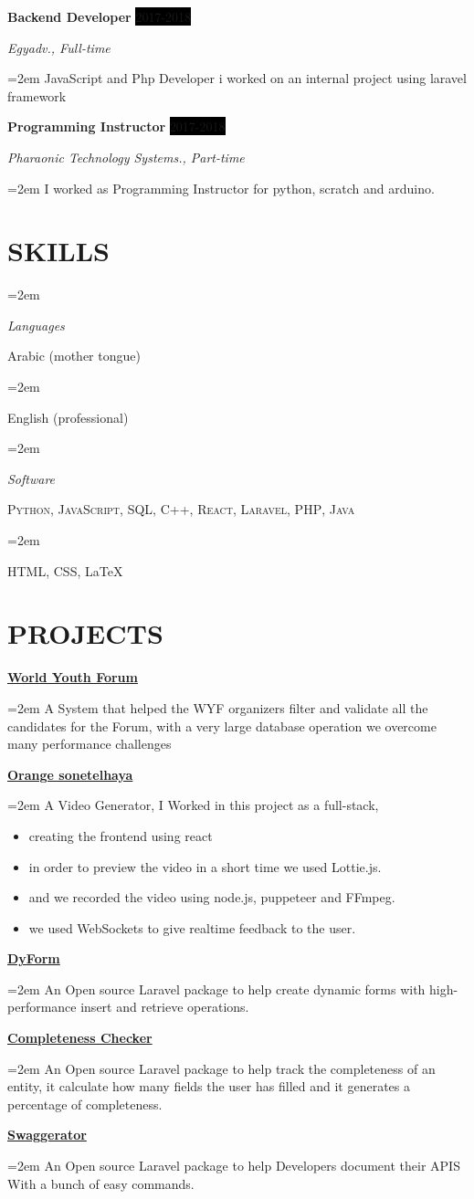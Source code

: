 \documentclass[paper=a4,fontsize=11pt]{scrartcl} %
\newlength{\spacebox}
\newcommand{\sepspace}{\vspace*{1em}}		%
\newcommand{\NewPart}[1]{\section*{\uppercase{#1}}}
\newcommand{\PersonalEntry}[2]{
		\noindent\hangindent=2em\hangafter=0 %
		\parbox{\spacebox}{        %
		\textit{#1}}		       %
		\hspace{1.5em} #2 \par}    %
\newcommand{\SkillsEntry}[2]{      %
		\noindent\hangindent=2em\hangafter=0 %
		\parbox{\spacebox}{        %
		\textit{#1}}			   %
		\hspace{1.5em} #2 \par}    %
\newcommand{\EducationEntry}[4]{
		\noindent \textbf{#1} \hfill      %
		\colorbox{Black}{%
			\parbox{6em}{%
			\hfill\color{White}#2}} \par  %
		\noindent \textit{#3} \par        %
		\noindent\hangindent=2em\hangafter=0 \small #4 %
		\normalsize \par}
\newcommand{\WorkEntry}[4]{				  %
		\noindent \textbf{#1} \hfill      %
		\colorbox{Black}{\color{White}#2} \par  %
		\noindent \textit{#3} \par              %
		\noindent\hangindent=2em\hangafter=0 \small #4 %
		\normalsize \par}
\newcommand{\ProjectEntry}[2]{
		\noindent \textbf{#1} \hfill      %
		
		\noindent\hangindent=2em\hangafter=0 \small #2 %
		\normalsize \par}
\begin{document}
\WorkEntry{Backend Developer}{2017-2018}{Egyadv., Full-time}{JavaScript and Php Developer i worked on an internal project using laravel framework }

\sepspace
\WorkEntry{Programming Instructor}{2017-2018}{Pharaonic Technology Systems., Part-time}{I worked as Programming Instructor for python, scratch and arduino.}
\NewPart{Skills}{
\SkillsEntry{Languages}{Arabic (mother tongue)}
\SkillsEntry{}{English (professional)}


\SkillsEntry{Software}{\textsc{Python}, \textsc{JavaScript},  \textsc{SQL}, \textsc{C++}, \textsc{React}, \textsc{Laravel}, \textsc{PHP}, \textsc{Java}}
}
\SkillsEntry{}{\textsc{HTML}, \textsc{CSS}, \LaTeX}



\NewPart{projects}{
\ProjectEntry{\href{https://wyfegypt.com/}{World Youth Forum}}{A System that helped the WYF organizers filter and validate all the candidates for the Forum, with a very large database operation we overcome many performance challenges}
\ProjectEntry{\href{https://orange-sonetelhaya.com/}{Orange sonetelhaya}}{A Video Generator, I Worked in this project as a full-stack, 
\begin{itemize}
 \item creating the frontend using react
 \item in order to preview the video in a short time we used Lottie.js.
 \item and we recorded the video using node.js, puppeteer and FFmpeg.
 \item we used WebSockets to give realtime feedback to the user.
\end{itemize}
}

\ProjectEntry{\href{https://github.com/peter44322/dy-form}{DyForm}}{An Open source Laravel package to help create dynamic forms with high-performance insert and retrieve operations.}
}

\ProjectEntry{\href{https://github.com/peter44322/laravel-completeness-checker}{Completeness Checker}}{An Open source Laravel package to help track the completeness of an entity, it calculate how many fields the user has filled and it generates a percentage of completeness.}

\ProjectEntry{\href{https://github.com/peter44322/Swaggerator}{Swaggerator}}{An Open source Laravel package to help  Developers document their APIS With a bunch of easy commands.}
\end{document}
